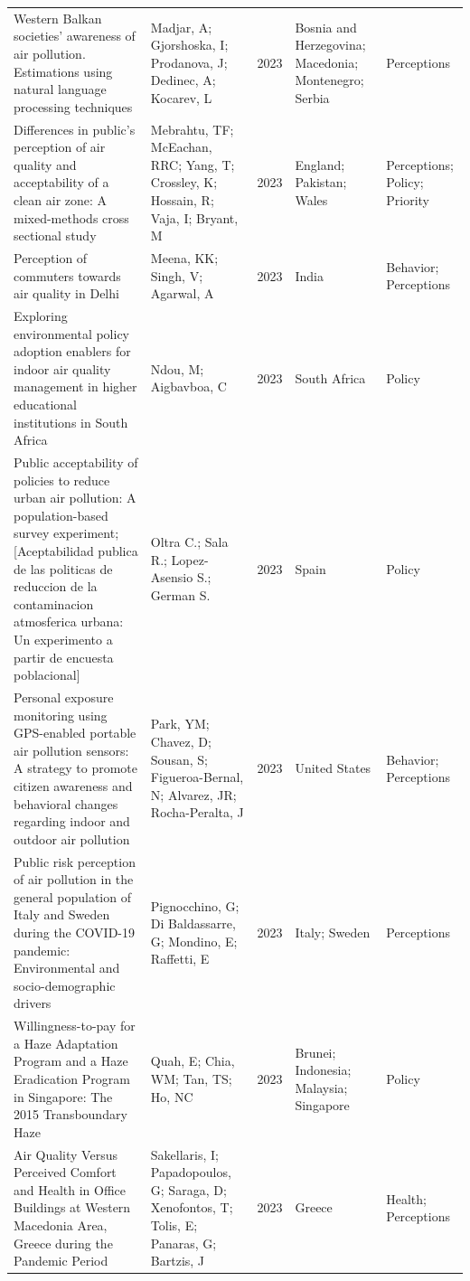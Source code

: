 {\begin{longtable}[t]{p{6cm}p{3cm}lp{3cm}p{3cm}}
Western Balkan societies' awareness of air pollution. Estimations using natural language processing techniques & Madjar, A; Gjorshoska, I; Prodanova, J; Dedinec, A; Kocarev, L & 2023 & Bosnia and Herzegovina; Macedonia; Montenegro; Serbia & Perceptions\\
Differences in public's perception of air quality and acceptability of a clean air zone: A mixed-methods cross sectional study & Mebrahtu, TF; McEachan, RRC; Yang, T; Crossley, K; Hossain, R; Vaja, I; Bryant, M & 2023 & England; Pakistan; Wales & Perceptions; Policy; Priority\\
Perception of commuters towards air quality in Delhi & Meena, KK; Singh, V; Agarwal, A & 2023 & India & Behavior; Perceptions\\
\addlinespace
Exploring environmental policy adoption enablers for indoor air quality management in higher educational institutions in South Africa & Ndou, M; Aigbavboa, C & 2023 & South Africa & Policy\\
Public acceptability of policies to reduce urban air pollution: A population-based survey experiment; [Aceptabilidad publica de las politicas de reduccion de la contaminacion atmosferica urbana: Un experimento a partir de encuesta poblacional] & Oltra C.; Sala R.; Lopez-Asensio S.; German S. & 2023 & Spain & Policy\\
Personal exposure monitoring using GPS-enabled portable air pollution sensors: A strategy to promote citizen awareness and behavioral changes regarding indoor and outdoor air pollution & Park, YM; Chavez, D; Sousan, S; Figueroa-Bernal, N; Alvarez, JR; Rocha-Peralta, J & 2023 & United States & Behavior; Perceptions\\
Public risk perception of air pollution in the general population of Italy and Sweden during the COVID-19 pandemic: Environmental and socio-demographic drivers & Pignocchino, G; Di Baldassarre, G; Mondino, E; Raffetti, E & 2023 & Italy; Sweden & Perceptions\\
Willingness-to-pay for a Haze Adaptation Program and a Haze Eradication Program in Singapore: The 2015 Transboundary Haze & Quah, E; Chia, WM; Tan, TS; Ho, NC & 2023 & Brunei; Indonesia; Malaysia; Singapore & Policy\\
\addlinespace
Air Quality Versus Perceived Comfort and Health in Office Buildings at Western Macedonia Area, Greece during the Pandemic Period & Sakellaris, I; Papadopoulos, G; Saraga, D; Xenofontos, T; Tolis, E; Panaras, G; Bartzis, J & 2023 & Greece & Health; Perceptions\\

\end{longtable}}
